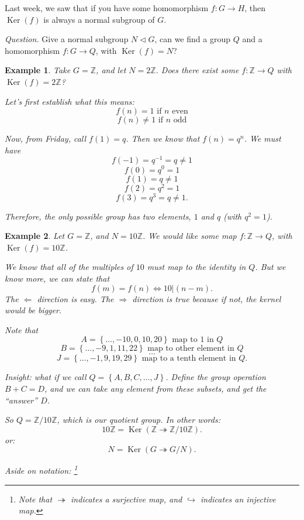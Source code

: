 \documentclass[12pt]{article}
\newtheorem*{example}{Example}
\DeclareMathOperator{\Ker}{Ker}
\def\ZZ{\mathbb{Z}}
\begin{document}
Last week, we saw that if you have some homomorphism $f: G \to H$, then $\Ker(f)$ is always a normal subgroup of $G$.

{\it Question.} Give a normal subgroup $N \triangleleft G$, can we find a group $Q$ and a homomorphism $f: G \to Q$, with $\Ker(f) = N$?

\begin{example}
  Take $G = \ZZ$, and let $N = 2 \ZZ$.  Does there exist some $f: \ZZ \to Q$ with $\Ker(f) = 2 \ZZ$?

  Let's first establish what this means:
  \[
    f(n) = 1 \text{ if $n$ even}
  \]
  \[
    f(n) \neq 1 \text{ if $n$ odd}
  \]

  Now, from Friday, call $f(1) = q$.  Then we know that $f(n) = q^n$.  We must have
  \[
    f(-1) = q^{-1} = q \neq 1
  \]
  \[
    f(0) = q^{0} = 1
  \]
  \[
    f(1) = q \neq 1
  \]
  \[
    f(2) = q^{2} = 1
  \]
  \[
    f(3) = q^{3} = q \neq 1.
  \]

  Therefore, the only possible group has two elements, $1$ and $q$ (with $q^2 = 1$). \\
\end{example}

\begin{example}
  Let $G = \ZZ$, and $N = 10 \ZZ$.  We would like some map $f: \ZZ \to Q$, with $\Ker(f) = 10\ZZ$.

  We know that all of the multiples of $10$ must map to the identity in $Q$.  But we know more, we can state that
  \[
    f(m) = f(n) \Leftrightarrow 10 | (n-m).
  \]
  The $\Leftarrow$ direction is easy.  The $\Rightarrow$ direction is true because if not, the kernel would be bigger.

  Note that
  \[
    A = \left\{ \dots, -10, 0, 10, 20 \right\} \text{ map to 1 in $Q$}
  \]
  \[
    B = \left\{ \dots, -9, 1, 11, 22 \right\} \text{ map to other element in $Q$}
  \]
  \[
    \dots
  \]
  \[
    J = \left\{ \dots, -1, 9, 19, 29 \right\} \text{ map to a tenth element in $Q$}.
  \]

  Insight: what if we call $Q = \left\{ A, B, C, \dots, J \right\}$.  Define the group operation $B+C = D$, and we can take any element from these subsets, and get the ``answer'' $D$.

  So $Q = \ZZ / 10 \ZZ$, which is our quotient group.  In other words:
  \[
    10 \ZZ = \Ker (\ZZ \twoheadrightarrow \ZZ / 10 \ZZ).
  \]
  or:
  \[
    N = \Ker(G \twoheadrightarrow G / N).
  \]



  Aside on notation: \footnote{Note that $\twoheadrightarrow$ indicates a surjective map, and $\hookrightarrow$ indicates an injective map.}
\end{example}
\end{document}
